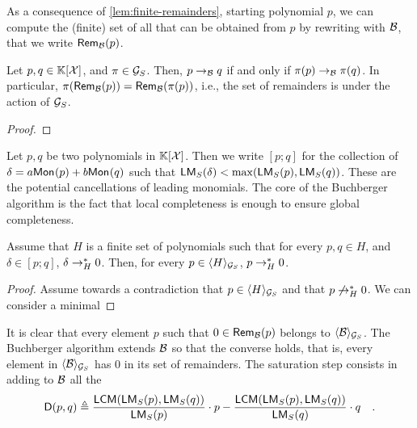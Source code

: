 \AP As a consequence of \cref{lem:finite-remainders}, starting polynomial $p$,
we can compute the (finite) set of all  that can be obtained
from $p$ by rewriting with $\Basis$, that we write $\rem{\Basis}{p}$. 

\begin{lemma}
    \label{lem:rewrite-equivariant}
    Let $p,q \in \poly{\K}{\X}$, and $\pi \in \group_S$.
    Then,
    $p \reducstep{\Basis} q$ if and only if
    $\pi(p) \reducstep{\Basis} \pi(q)$.
    In particular, $\pi(\rem{\Basis}{p}) = \rem{\Basis}{\pi(p)}$,
    i.e., the set of remainders is 
    under the action of $\group_S$.
\end{lemma}
\begin{proof}
\end{proof}


\AP Let $p,q$ be two polynomials in $\poly{\K}{\X}$. Then we write $[p;q]$ for
the collection of  $\delta = a \mon p + b \mon q$ such that
$\lm[S](\delta) < \max(\lm[S](p), \lm[S](q))$. These are the potential
cancellations of leading monomials.
The core of the Buchberger algorithm is the fact that
local completeness is enough to ensure global completeness.

\begin{lemma}
  \label{lem:weak-complete-impl-strong}
  Assume that $H$ is a finite set of polynomials
  such that for every $p, q \in H$, and $\delta \in [p;q]$,
  $\delta \reduc{H} 0$.
  Then, for every $p \in \gen{H}{\group_S}$,
  $p \reduc{H} 0$.
\end{lemma}
\begin{proof}
  Assume towards a contradiction that $p \in \gen{H}{\group_S}$
  and that $p \not\reduc{H} 0$.
  We can consider a minimal
\end{proof}

\AP It is clear that every element $p$ such that $0 \in \rem{\Basis}{p}$
belongs to $\gen{\Basis}{\group_S}$. The Buchberger algorithm extends $\Basis$
so that the converse holds, that is, every element in $\gen{\Basis}{\group_S}$
has $0$ in its set of remainders. The saturation step consists in adding to
$\Basis$ all the  
\begin{equation}
    \label{eq:d-polynomial}
    \spoly{p}{q} \defined
    \frac{\lcm(\lm[S](p), \lm[S](q))}{\lm[S](p)} \cdot p
    - \frac{\lcm(\lm[S](p), \lm[S](q))}{\lm[S](q)} \cdot q
    \quad .
\end{equation}

